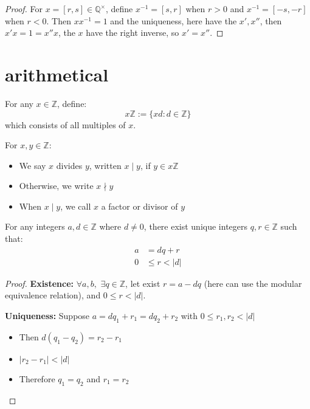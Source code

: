 \documentclass[11pt,lang=en]{elegantbook}
\begin{document}
\begin{proof}
  For $x = [r,s] \in \mathbb{Q}^{\times}$, define $x^{-1} = [s,r]$ when $r > 0$ and $x^{-1} = [-s,-r]$ when $r < 0$.
  Then $xx^{-1} = 1$ and the uniqueness, here have the $x',x''$, then $x'x=1=x''x$, the $x$ have the right inverse, so $x'=x''$.
\end{proof}

\section{arithmetical}

\begin{definition}
  For any $x \in \mathbb{Z}$, define:
  \[
    x\mathbb{Z} := \{xd : d \in \mathbb{Z}\}
  \]
  which consists of all multiples of $x$.

  For $x,y \in \mathbb{Z}$:
  \begin{itemize}
    \item We say $x$ divides $y$, written $x\mid y$, if $y \in x\mathbb{Z}$
    \item Otherwise, we write $x \nmid y$
    \item When $x\mid y$, we call $x$ a factor or divisor of $y$
  \end{itemize}
\end{definition}

\begin{proposition}
  For any integers $a,d \in \mathbb{Z}$ where $d \neq 0$, there exist unique integers $q,r \in \mathbb{Z}$ such that:
  \begin{align*}
    a &= dq + r \\
    0 &\leq r < |d|
  \end{align*}
\end{proposition}

\begin{proof}
  \textbf{Existence:}  $\forall a,b,$ $\exists q\in \mathbb{Z}$, let exist $r = a - dq$ (here can use the modular equivalence relation), and $0\leq r<|d|$.

  \textbf{Uniqueness:}
  Suppose $a = dq_1 + r_1 = dq_2 + r_2$ with $0 \leq r_1,r_2 < |d|$
  \begin{itemize}
    \item Then $d(q_1 - q_2) = r_2 - r_1$
    \item $|r_2 - r_1| < |d|$
    \item Therefore $q_1 = q_2$ and $r_1 = r_2$
  \end{itemize}
\end{proof}
\end{document}
